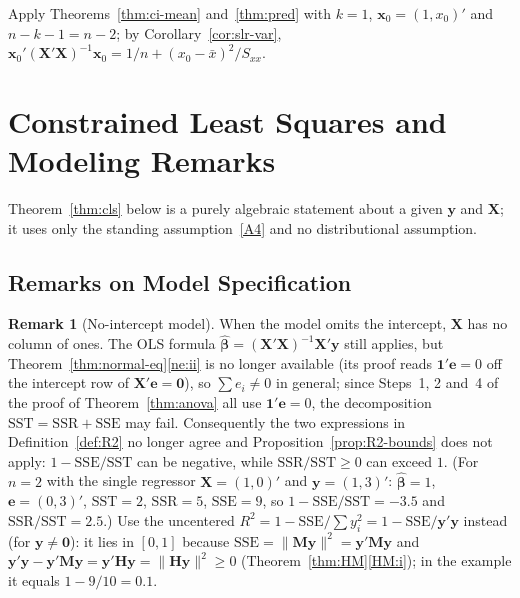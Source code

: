 \documentclass[12pt,a4paper]{article}
\makeatletter
\theoremstyle{definition}
\newtheorem{remark}[theorem]{Remark}
\renewenvironment{proof}[1][\proofname]{\par
  \pushQED{\qed}%
  \normalfont \topsep6\p@\@plus6\p@\relax
  \trivlist
  \item[\hskip\labelsep\bfseries #1\@addpunct{.}]\ignorespaces
}{%
  \popQED\endtrivlist\@endpefalse
}
\newcommand{\SST}{\mathrm{SST}}
\newcommand{\SSR}{\mathrm{SSR}}
\newcommand{\SSE}{\mathrm{SSE}}
\newcommand{\bX}{\mathbf{X}}
\newcommand{\by}{\mathbf{y}}
\newcommand{\bx}{\mathbf{x}}
\def\bb{\boldsymbol{\beta}}
\newcommand{\bH}{\mathbf{H}}
\newcommand{\bM}{\mathbf{M}}
\newcommand{\bone}{\mathbf{1}}
\newcommand{\bzero}{\mathbf{0}}
\makeatother
\begin{document}
\begin{proof}
Apply Theorems~\ref{thm:ci-mean} and~\ref{thm:pred} with $k = 1$, $\bx_0 = (1, x_0)'$ and $n - k - 1 = n - 2$; by Corollary~\ref{cor:slr-var}, $\bx_0'(\bX'\bX)^{-1}\bx_0 = 1/n + (x_0 - \bar x)^2/S_{xx}$.
\end{proof}

\section{Constrained Least Squares and Modeling Remarks}\label{sec:special}

Theorem~\ref{thm:cls} below is a purely algebraic statement about a given $\by$ and $\bX$; it uses only the standing assumption~\ref{A4} and no distributional assumption.

\subsection{Remarks on Model Specification}

\begin{remark}[No-intercept model]\label{rem:no-intercept}
When the model omits the intercept, $\bX$ has no column of ones. The OLS formula $\hat{\bb} = (\bX'\bX)^{-1}\bX'\by$ still applies, but Theorem~\ref{thm:normal-eq}\ref{ne:ii} is no longer available (its proof reads $\bone'\mathbf{e} = 0$ off the intercept row of $\bX'\mathbf{e} = \bzero$), so $\sum e_i \neq 0$ in general; since Steps~1, 2 and~4 of the proof of Theorem~\ref{thm:anova} all use $\bone'\mathbf{e} = 0$, the decomposition $\SST = \SSR + \SSE$ may fail. Consequently the two expressions in Definition~\ref{def:R2} no longer agree and Proposition~\ref{prop:R2-bounds} does not apply: $1 - \SSE/\SST$ can be negative, while $\SSR/\SST \geqslant 0$ can exceed $1$. (For $n = 2$ with the single regressor $\bX = (1, 0)'$ and $\by = (1, 3)'$: $\hat{\bb} = 1$, $\mathbf{e} = (0, 3)'$, $\SST = 2$, $\SSR = 5$, $\SSE = 9$, so $1 - \SSE/\SST = -3.5$ and $\SSR/\SST = 2.5$.) Use the uncentered $R^2 = 1 - \SSE/\sum y_i^2 = 1 - \SSE/\by'\by$ instead (for $\by \neq \bzero$): it lies in $[0, 1]$ because $\SSE = \|\bM\by\|^2 = \by'\bM\by$ and $\by'\by - \by'\bM\by = \by'\bH\by = \|\bH\by\|^2 \geqslant 0$ (Theorem~\ref{thm:HM}\ref{HM:i}); in the example it equals $1 - 9/10 = 0.1$.
\end{remark}
\end{document}
